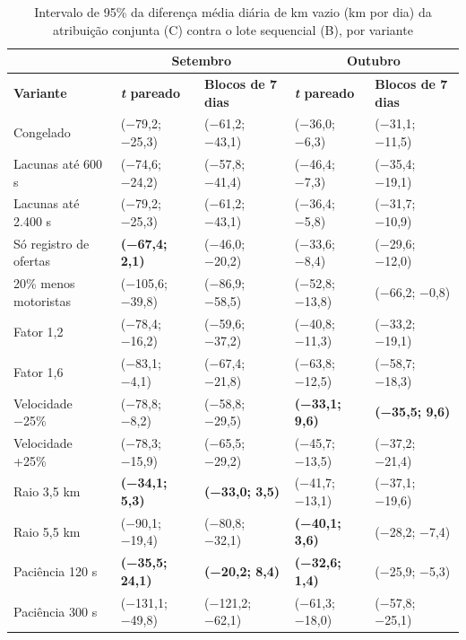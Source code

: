 \begin{table}[!htb]
\caption{Intervalo de 95\% da diferença média diária de km vazio (km por dia) da atribuição conjunta (C) contra o lote sequencial (B), por variante}\label{tab:sensic}
\centering\fontetabela\setlength{\tabcolsep}{4pt}
\begin{tabular}{|l|l|l|l|l|}
\hline
 & \multicolumn{2}{|c|}{\textbf{Setembro}} & \multicolumn{2}{|c|}{\textbf{Outubro}} \\
\hline
\textbf{Variante} & \textbf{\textit{t} pareado} & \textbf{Blocos de 7 dias} & \textbf{\textit{t} pareado} & \textbf{Blocos de 7 dias} \\
\hline
Congelado & (−79,2; −25,3) & (−61,2; −43,1) & (−36,0; −6,3) & (−31,1; −11,5) \\
\hline
Lacunas até 600 s & (−74,6; −24,2) & (−57,8; −41,4) & (−46,4; −7,3) & (−35,4; −19,1) \\
\hline
Lacunas até 2.400 s & (−79,2; −25,3) & (−61,2; −43,1) & (−36,4; −5,8) & (−31,7; −10,9) \\
\hline
Só registro de ofertas & \textbf{(−67,4; 2,1)} & (−46,0; −20,2) & (−33,6; −8,4) & (−29,6; −12,0) \\
\hline
20\% menos motoristas & (−105,6; −39,8) & (−86,9; −58,5) & (−52,8; −13,8) & (−66,2; −0,8) \\
\hline
Fator 1,2 & (−78,4; −16,2) & (−59,6; −37,2) & (−40,8; −11,3) & (−33,2; −19,1) \\
\hline
Fator 1,6 & (−83,1; −4,1) & (−67,4; −21,8) & (−63,8; −12,5) & (−58,7; −18,3) \\
\hline
Velocidade −25\% & (−78,8; −8,2) & (−58,8; −29,5) & \textbf{(−33,1; 9,6)} & \textbf{(−35,5; 9,6)} \\
\hline
Velocidade +25\% & (−78,3; −15,9) & (−65,5; −29,2) & (−45,7; −13,5) & (−37,2; −21,4) \\
\hline
Raio 3,5 km & \textbf{(−34,1; 5,3)} & \textbf{(−33,0; 3,5)} & (−41,7; −13,1) & (−37,1; −19,6) \\
\hline
Raio 5,5 km & (−90,1; −19,4) & (−80,8; −32,1) & \textbf{(−40,1; 3,6)} & (−28,2; −7,4) \\
\hline
Paciência 120 s & \textbf{(−35,5; 24,1)} & \textbf{(−20,2; 8,4)} & \textbf{(−32,6; 1,4)} & (−25,9; −5,3) \\
\hline
Paciência 300 s & (−131,1; −49,8) & (−121,2; −62,1) & (−61,3; −18,0) & (−57,8; −25,1) \\
\hline
\end{tabular}
\end{table}

